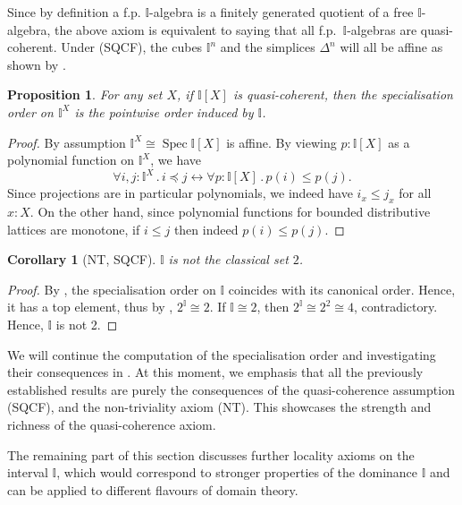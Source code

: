 \documentclass[12pt]{amsart}
\newtheorem{corollary}[theorem]{Corollary}
\newtheorem{proposition}[theorem]{Proposition}
\theoremstyle{definition}
\newcommand{\mbb}[1]{\mathbb{#1}}
\newcommand{\I}{\mbb I}
\newcommand{\fa}[2]{\forall #1\!\colon\!\!#2\mathpunct{.}}
\newcommand{\eq}{\leftrightarrow}
\newcommand{\spec}{\operatorname{Spec}}
\begin{document}
Since by definition a f.p. $\I$-algebra is a finitely generated quotient of a free $\I$-algebra, the above axiom is equivalent to saying that all f.p.\ $\I$-algebras are quasi-coherent. 
Under (SQCF), the cubes $\I^n$ and the simplices $\Delta^n$ will all be affine as shown by .

\begin{proposition}\label{cor:pointwisecubeorder}
  For any set $X$, if $\I[X]$ is quasi-coherent, then the specialisation order on $\I^X$ is the pointwise order induced by $\I$.
\end{proposition}
\begin{proof}
  By assumption $\I^X \cong \spec\I[X]$ is affine. By viewing $p : \I[X]$ as a polynomial function on $\I^X$, we have
  \[ \fa{i,j}{\I^X} i \preceq j \eq \fa p{\I[X]} p(i) \le p(j). \]
  Since projections are in particular polynomials, we indeed have $i_x \le j_x$ for all $x : X$. On the other hand, since polynomial functions for bounded distributive lattices are monotone, if $i \le j$ then indeed $p(i) \le p(j)$. 
\end{proof}

\begin{corollary}[NT, SQCF]\label{cor:intisnot2}
  $\I$ is not the classical set $2$.
\end{corollary}
\begin{proof}
  By , the specialisation order on $\I$ coincides with its canonical order. Hence, it has a top element, thus by , $2^\I \cong 2$. If $\I \cong 2$, then $2^\I \cong 2^2 \cong 4$, contradictory. Hence, $\I$ is not 2.
\end{proof}

We will continue the computation of the specialisation order and investigating their consequences in . At this moment, we emphasis that all the previously established results are purely the consequences of the quasi-coherence assumption (SQCF), and the non-triviality axiom (NT). This showcases the strength and richness of the quasi-coherence axiom.

The remaining part of this section discusses further locality axioms on the interval $\I$, which would correspond to stronger properties of the dominance $\I$ and can be applied to different flavours of domain theory. 
\end{document}
